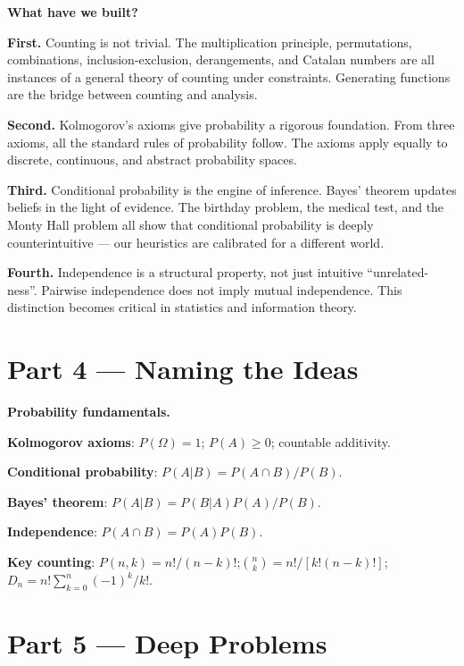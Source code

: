 \documentclass[12pt, a4paper]{article}
\newcounter{problem}
\begin{document}
\begin{discoverybox}
\textbf{What have we built?}

\textbf{First.} Counting is not trivial. The multiplication principle, permutations, combinations, inclusion-exclusion, derangements, and Catalan numbers are all instances of a general theory of counting under constraints. Generating functions are the bridge between counting and analysis.

\textbf{Second.} Kolmogorov's axioms give probability a rigorous foundation. From three axioms, all the standard rules of probability follow. The axioms apply equally to discrete, continuous, and abstract probability spaces.

\textbf{Third.} Conditional probability is the engine of inference. Bayes' theorem updates beliefs in the light of evidence. The birthday problem, the medical test, and the Monty Hall problem all show that conditional probability is deeply counterintuitive --- our heuristics are calibrated for a different world.

\textbf{Fourth.} Independence is a structural property, not just intuitive ``unrelated-ness''. Pairwise independence does not imply mutual independence. This distinction becomes critical in statistics and information theory.
\end{discoverybox}

\section{Part 4 \texorpdfstring{---}{--} Naming the Ideas}

\begin{namebox}
\textbf{Probability fundamentals.}

\textbf{Kolmogorov axioms}: $P(\Omega)=1$; $P(A)\geq 0$; countable additivity.

\textbf{Conditional probability}: $P(A|B)=P(A\cap B)/P(B)$.

\textbf{Bayes' theorem}: $P(A|B)=P(B|A)P(A)/P(B)$.

\textbf{Independence}: $P(A\cap B)=P(A)P(B)$.

\textbf{Key counting}: $P(n,k)=n!/(n-k)!$;\quad $\binom{n}{k}=n!/[k!(n-k)!]$;\quad $D_n=n!\sum_{k=0}^n(-1)^k/k!$.
\end{namebox}

\section{Part 5 \texorpdfstring{---}{--} Deep Problems}
\end{document}
